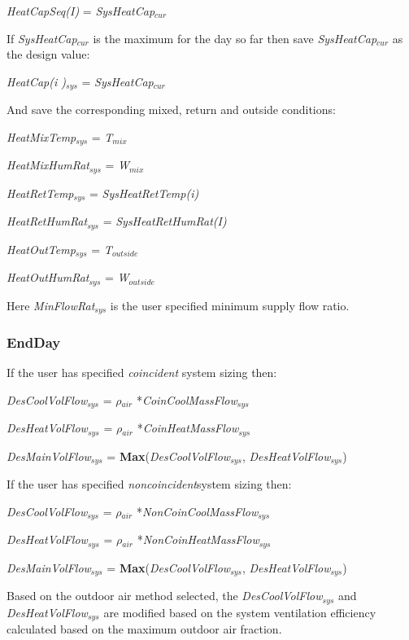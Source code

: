 \emph{HeatCapSeq(I)} = \emph{SysHeatCap\(_{cur}\)}

If \emph{SysHeatCap\(_{cur}\)} is the maximum for the day so far then save \emph{SysHeatCap\(_{cur}\)} as the design value:

\emph{HeatCap(i )\(_{sys}\)} = \emph{SysHeatCap\(_{cur}\)}

And save the corresponding mixed, return and outside conditions:

\emph{HeatMixTemp\(_{sys}\)} = \emph{T\(_{mix}\)}

\emph{HeatMixHumRat\(_{sys}\)} = \emph{W\(_{mix}\)}

\emph{HeatRetTemp\(_{sys}\)} = \emph{SysHeatRetTemp(i)}

\emph{HeatRetHumRat\(_{sys}\)} = \emph{SysHeatRetHumRat(I)}

\emph{HeatOutTemp\(_{sys}\)} = \emph{T\(_{outside}\)}

\emph{HeatOutHumRat\(_{sys}\)} = \emph{W\(_{outside}\)}

Here \emph{MinFlowRat\(_{sys}\)} is the user specified minimum supply flow ratio.

\subsubsection{EndDay}\label{endday}

If the user has specified \emph{coincident} system sizing then:

\emph{DesCoolVolFlow\(_{sys}\)} = \emph{$\rho$\(_{air}\)} *\emph{CoinCoolMassFlow\(_{sys}\)}

\emph{DesHeatVolFlow\(_{sys}\)} = \emph{$\rho$\(_{air}\)} *\emph{CoinHeatMassFlow\(_{sys}\)}

\emph{DesMainVolFlow\(_{sys}\)} = \textbf{Max}(\emph{DesCoolVolFlow\(_{sys}\)}, \emph{DesHeatVolFlow\(_{sys}\)})

If the user has specified \emph{noncoincident}system sizing then:

\emph{DesCoolVolFlow\(_{sys}\)} = \emph{$\rho$\(_{air}\)} *\emph{NonCoinCoolMassFlow\(_{sys}\)}

\emph{DesHeatVolFlow\(_{sys}\)} = \emph{$\rho$\(_{air}\)} *\emph{NonCoinHeatMassFlow\(_{sys}\)}

\emph{DesMainVolFlow\(_{sys}\)} = \textbf{Max}(\emph{DesCoolVolFlow\(_{sys}\)}, \emph{DesHeatVolFlow\(_{sys}\)})

Based on the outdoor air method selected, the \emph{DesCoolVolFlow\(_{sys}\)} and \emph{DesHeatVolFlow\(_{sys}\)} are modified based on the system ventilation efficiency calculated based on the maximum outdoor air fraction.

